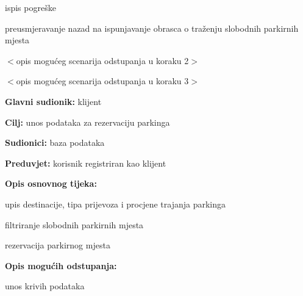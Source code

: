 \begin{packed_item}
\begin{packed_item}
\begin{packed_item}
\begin{packed_enum}
    							\item ispis pogreške
    							\item preusmjeravanje nazad na ispunjavanje obrasca o traženju slobodnih parkirnih mjesta
    							
    						\end{packed_enum}
    						\item[2.b] $<$opis mogućeg scenarija odstupanja u koraku 2$>$
    						\item[3.a] $<$opis mogućeg scenarija odstupanja  u koraku 3$>$
    						
    					\end{packed_item}
    				\end{packed_item}
    				\noindent {}
    				\begin{packed_item}
    					
    					\item \textbf{Glavni sudionik: } klijent
    					\item  \textbf{Cilj:} unos podataka za rezervaciju parkinga
    					\item  \textbf{Sudionici:} baza podataka
    					\item  \textbf{Preduvjet:} korisnik registriran kao klijent
    					\item  \textbf{Opis osnovnog tijeka:}
    					
    					\item[] \begin{packed_enum}
    						
    						\item upis destinacije, tipa prijevoza i procjene trajanja parkinga
    						\item filtriranje slobodnih parkirnih mjesta
    						\item rezervacija parkirnog mjesta

    					\end{packed_enum}
    					
    					\item  \textbf{Opis mogućih odstupanja:}
    					
    					\item[] \begin{packed_item}
    						
    						\item[2.a] unos krivih podataka
    						\item[] \begin{packed_enum}
    							

\end{packed_enum}
\end{packed_item}
\end{packed_item}
\end{packed_item}
